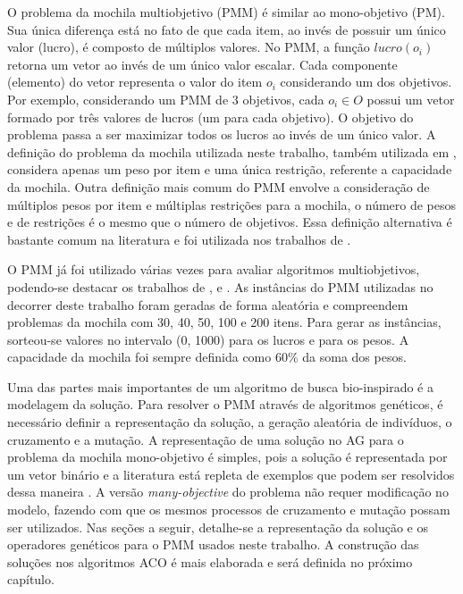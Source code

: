 O problema da mochila multiobjetivo (PMM) é similar ao mono-objetivo (PM). Sua única diferença está no fato de que cada item, ao invés de possuir um único valor (lucro), é composto de múltiplos valores. No PMM, a função $lucro(o_i)$ retorna um vetor ao invés de um único valor escalar. Cada componente (elemento) do vetor representa o valor do item $o_i$ considerando um dos objetivos. Por exemplo, considerando um PMM de 3 objetivos, cada $o_i \in O$ possui um vetor formado por três valores de lucros (um para cada objetivo). O objetivo do problema passa a ser maximizar todos os lucros ao invés de um único valor. A definição do problema da mochila utilizada neste trabalho, também utilizada em \cite{MKP}, considera apenas um peso por item e uma única restrição, referente a capacidade da mochila. Outra definição mais comum do PMM envolve a consideração de múltiplos pesos por item e múltiplas restrições para a mochila, o número de pesos e de restrições é o mesmo que o número de objetivos. Essa definição alternativa é bastante comum na literatura e foi utilizada nos trabalhos de \cite{Alaya2004,Chu1998,Ishibuchi2015}. 

O PMM já foi utilizado várias vezes para avaliar algoritmos multiobjetivos, podendo-se destacar os trabalhos de \cite{Zitzler1999}, \cite{Zitzler2002} e \cite{Zhang2007}. As instâncias do PMM utilizadas no decorrer deste trabalho foram geradas de forma aleatória e compreendem problemas da mochila com 30, 40, 50, 100 e 200 itens. Para gerar as instâncias, sorteou-se valores no intervalo (0, 1000) para os lucros e para os pesos. A capacidade da mochila foi sempre definida como 60\% da soma dos pesos.

Uma das partes mais importantes de um algoritmo de busca bio-inspirado é a modelagem da solução. Para resolver o PMM através de algoritmos genéticos, é necessário definir a representação da solução, a geração aleatória de indivíduos, o cruzamento e a mutação. A representação de uma solução no AG para o problema da mochila mono-objetivo é simples, pois a solução é representada por um vetor binário e a literatura está repleta de exemplos que podem ser resolvidos dessa maneira \cite{KnapsackGA,Hristakeva2013}. A versão \textit{many-objective} do problema não requer modificação no modelo, fazendo com que os mesmos processos de cruzamento e mutação possam ser utilizados. Nas seções a seguir, detalhe-se a representação da solução e os operadores genéticos para o PMM usados neste trabalho. A construção das soluções nos algoritmos ACO é mais elaborada e será definida no próximo capítulo.

